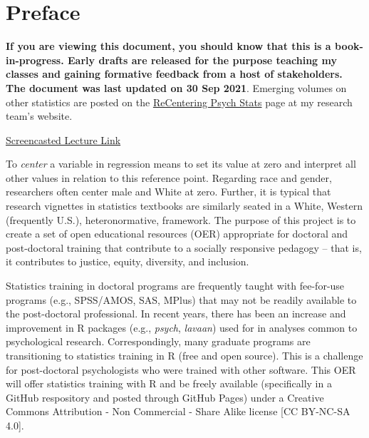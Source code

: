 \documentclass[
  english,
]{book}
\begin{document}
\hypertarget{preface}{%
\chapter*{Preface}\label{preface}}

\textbf{If you are viewing this document, you should know that this is a book-in-progress. Early drafts are released for the purpose teaching my classes and gaining formative feedback from a host of stakeholders. The document was last updated on 30 Sep 2021}. Emerging volumes on other statistics are posted on the \href{https://lhbikos.github.io/BikosRVT/ReCenter.html}{ReCentering Psych Stats} page at my research team's website.

\href{https://spu.hosted.panopto.com/Panopto/Pages/Viewer.aspx?id=c932455e-ef06-444a-bdca-acf7012d759a}{Screencasted Lecture Link}

To \emph{center} a variable in regression means to set its value at zero and interpret all other values in relation to this reference point. Regarding race and gender, researchers often center male and White at zero. Further, it is typical that research vignettes in statistics textbooks are similarly seated in a White, Western (frequently U.S.), heteronormative, framework. The purpose of this project is to create a set of open educational resources (OER) appropriate for doctoral and post-doctoral training that contribute to a socially responsive pedagogy -- that is, it contributes to justice, equity, diversity, and inclusion.

Statistics training in doctoral programs are frequently taught with fee-for-use programs (e.g., SPSS/AMOS, SAS, MPlus) that may not be readily available to the post-doctoral professional. In recent years, there has been an increase and improvement in R packages (e.g., \emph{psych}, \emph{lavaan}) used for in analyses common to psychological research. Correspondingly, many graduate programs are transitioning to statistics training in R (free and open source). This is a challenge for post-doctoral psychologists who were trained with other software. This OER will offer statistics training with R and be freely available (specifically in a GitHub respository and posted through GitHub Pages) under a Creative Commons Attribution - Non Commercial - Share Alike license {[}CC BY-NC-SA 4.0{]}.
\end{document}
